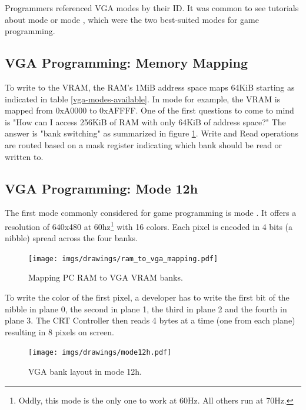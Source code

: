 \documentclass[book.tex]{subfiles}
\begin{document}
 Programmers referenced VGA modes by their ID. It was common to see tutorials about mode  or mode , which were the two best-suited modes for game programming.


 \subsection{VGA Programming: Memory Mapping}
To write to the VRAM, the RAM's 1MiB address space maps 64KiB starting as indicated in table \ref{vga-modes-available}. In mode  for example, the VRAM is mapped from 0xA0000 to 0xAFFFF. One of the first questions to come to mind is "How can I access 256KiB of RAM with only 64KiB of address space?" The answer is "bank switching" as summarized in figure \ref{ram_to_vga_mapping_label}. Write and Read operations are routed based on a mask register indicating which bank should be read or written to. \\
\par

 \subsection{VGA Programming: Mode 12h}
 The first mode commonly considered for game programming is mode . It offers a resolution of 640x480 at 60hz\footnote{Oddly, this mode is the only one to work at 60Hz. All others run at 70Hz.} with 16 colors. Each pixel is encoded in 4 bits (a nibble) spread across the four banks.\\
\par



\begin{figure}[H]
  \centering
  \texttt{[image: imgs/drawings/ram\_to\_vga\_mapping.pdf]}
  \caption{Mapping PC RAM to VGA VRAM banks.}
  \label{ram_to_vga_mapping_label}
\end{figure}
\par
 To write the color of the first pixel, a developer has to write the first bit of the nibble in plane 0, the second in plane 1, the third in plane 2 and the fourth in plane 3. The CRT Controller then reads 4 bytes at a time (one from each plane) resulting in 8 pixels on screen.\\
\par
 


\begin{figure}[H]
\centering
 \texttt{[image: imgs/drawings/mode12h.pdf]}
\caption{VGA bank layout in mode 12h.}
\end{figure}
\pagebreak
\end{document}

